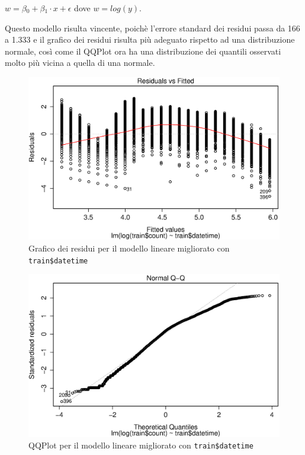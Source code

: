 \centering $ w = \beta{}_0 + \beta{}_1 \cdot{} x + \epsilon{} $
\flushleft dove $ w = log(y) $.

Questo modello risulta vincente, poichè l'errore standard dei residui passa da
166 a 1.333 e il grafico dei residui risulta più adeguato rispetto ad una
distribuzione normale, così come il QQPlot ora ha una distribuzione dei
quantili osservati molto più vicina a quella di una normale.

\begin{figure}[H]
  \centering
  \includegraphics[width=.7\columnwidth]{images/simple-lm-log-residuals.eps}
  \caption{Grafico dei residui per il modello lineare migliorato con
  \texttt{train\$datetime}}\label{fig:simpl-lm-log-residuals}
\end{figure}

\begin{figure}[H]
  \centering
  \includegraphics[width=.7\columnwidth]{images/simple-lm-log-qqplot.eps}
  \caption{QQPlot per il modello lineare migliorato con
  \texttt{train\$datetime}}\label{fig:simpl-lm-log-qqplot}
\end{figure}
